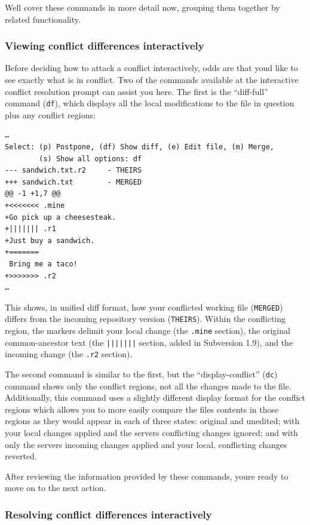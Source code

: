 We\textquotesingle ll cover these commands in more detail now, grouping
them together by related functionality.

\subsubsection{Viewing conflict differences
interactively}\label{svn.tour.cycle.resolve.diff}

Before deciding how to attack a conflict interactively, odds are that
you\textquotesingle d like to see exactly what is in conflict. Two of
the commands available at the interactive conflict resolution prompt can
assist you here. The first is the ``diff-full'' command (\texttt{df}),
which displays all the local modifications to the file in question plus
any conflict regions:

\begin{verbatim}
…
Select: (p) Postpone, (df) Show diff, (e) Edit file, (m) Merge,
        (s) Show all options: df
--- sandwich.txt.r2     - THEIRS
+++ sandwich.txt        - MERGED
@@ -1 +1,7 @@
+<<<<<<< .mine
+Go pick up a cheesesteak.
+||||||| .r1
+Just buy a sandwich.
+=======
 Bring me a taco!
+>>>>>>> .r2
…
\end{verbatim}

This shows, in unified diff format, how your conflicted working file
(\texttt{MERGED}) differs from the incoming repository version
(\texttt{THEIRS}). Within the conflicting region, the markers delimit
your local change (the \texttt{.mine} section), the original
common-ancestor text (the \texttt{|||||||} section, added in Subversion
1.9), and the incoming change (the \texttt{.r2} section).

The second command is similar to the first, but the ``display-conflict''
(\texttt{dc}) command shows only the conflict regions, not all the
changes made to the file. Additionally, this command uses a slightly
different display format for the conflict regions which allows you to
more easily compare the file\textquotesingle s contents in those regions
as they would appear in each of three states: original and unedited;
with your local changes applied and the server\textquotesingle s
conflicting changes ignored; and with only the server\textquotesingle s
incoming changes applied and your local, conflicting changes reverted.

After reviewing the information provided by these commands,
you\textquotesingle re ready to move on to the next action.

\subsubsection{Resolving conflict differences
interactively}\label{svn.tour.cycle.resolve.resolve}

